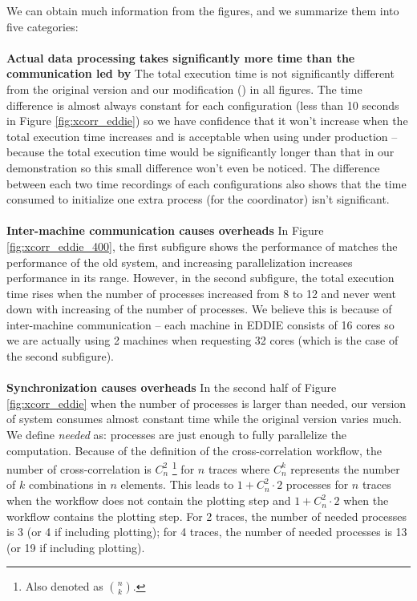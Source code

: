 We can obtain much information from the figures, and we summarize them into five categories: \\\\
\textbf{Actual data processing takes significantly more time than the communication led by \tincdep}\quad
The total execution time is not significantly different from the original \dpy version and our modification (\tincdep) in all figures. The time difference is almost always constant for each configuration (\eg less than 10 seconds in Figure \ref{fig:xcorr_eddie}) so we have confidence that it won't increase when the total execution time increases and is acceptable when using under production -- because the total execution time would be significantly longer than that in our demonstration so this small difference won't even be noticed. The difference between each two time recordings of each configurations also shows that the time consumed to initialize one extra process (for the coordinator) isn't significant. \\\\
\textbf{Inter-machine communication causes overheads}\quad
In Figure \ref{fig:xcorr_eddie_400}, the first subfigure shows the performance of \tincdep matches the performance of the old system, and increasing parallelization increases performance in its range. However, in the second subfigure, the total execution time rises when the number of processes increased from 8 to 12 and never went down with increasing of the number of processes. We believe this is because of inter-machine communication -- each machine in EDDIE consists of 16 cores so we are actually using 2 machines when requesting 32 cores (which is the case of the second subfigure). \\\\
\textbf{Synchronization causes overheads}\quad
In the second half of Figure \ref{fig:xcorr_eddie} when the number of processes is larger than needed, our version of system consumes almost constant time while the original version varies much. We define \emph{needed} as: processes are just enough to fully parallelize the computation. Because of the definition of the cross-correlation workflow, the number of cross-correlation is $C^2_n$ \footnote{Also denoted as $\binom{n}{k}$.} for $n$ traces where $C^k_n$ represents the number of $k$ combinations in $n$ elements. This leads to $1+C^2_n \cdot 2$ processes for $n$ traces when the workflow does not contain the plotting step and $1+C^2_n \cdot 2$ when the workflow contains the plotting step. For 2 traces, the number of needed processes is 3 (or 4 if including plotting); for 4 traces, the number of needed processes is 13 (or 19 if including plotting).

